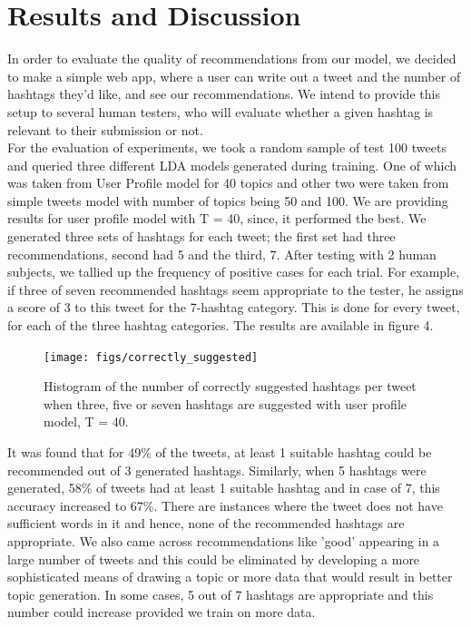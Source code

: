 \documentclass{acm_proc_article-sp}
\begin{document}
\section{Results and Discussion}
\hspace*{5mm}In order to evaluate the quality of recommendations from our model, we decided to make a simple web app, where a user can write out a tweet and the number of hashtags they'd like, and see our recommendations. We intend to provide this setup to several human testers, who will evaluate whether a given hashtag is relevant to their submission or not.\\
\hspace*{5mm}For the evaluation of experiments, we took a random sample of test 100 tweets and queried three different LDA models generated during training. One of which was taken from User Profile model for 40 topics and other two were taken from simple tweets model with number of topics being 50 and 100. We are providing results for user profile model with T = 40, since, it performed the best. We generated three sets of hashtags for each tweet; the first set had three recommendations, second had 5 and the third, 7. After testing with 2 human subjects, we tallied up the frequency of positive cases for each trial. For example, if three of seven recommended hashtags seem appropriate to the tester, he assigns a score of 3 to this tweet for the 7-hashtag category. This is done for every tweet, for each of the three hashtag categories. The results are available in figure 4. \\
\begin{figure}[ht]
	\texttt{[image: figs/correctly\_suggested]}
	\caption{Histogram of the number of correctly suggested
		hashtags per tweet when three, five or seven hashtags are suggested with user profile model, T = 40.}
	\label{fig:correct_hashtags}
\end{figure}

\hspace*{5mm}It was found that for 49\% of the tweets, at least 1 suitable hashtag could be recommended out of 3 generated hashtags. Similarly, when 5 hashtags were generated, 58\% of tweets had at least 1 suitable hashtag and in case of 7, this accuracy increased to 67\%. There are instances where the tweet does not have sufficient words in it and hence, none of the recommended hashtags are appropriate. We also came across recommendations like 'good' appearing in a large number of tweets and this could be eliminated by developing a more sophisticated means of drawing a topic or more data that would result in better topic generation. In some cases, 5 out of 7 hashtags are appropriate and this number could increase provided we train on more data.\\
\end{document}
